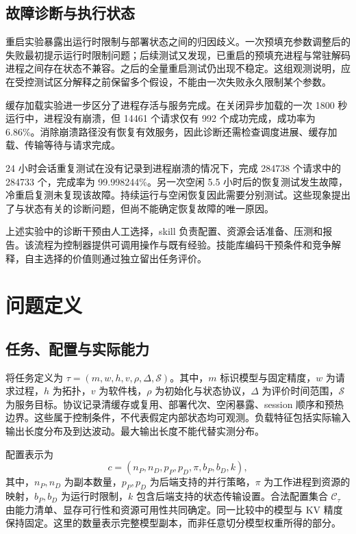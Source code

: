 \documentclass[UTF8,11pt,a4paper,fontset=windows]{ctexart}
\begin{document}
\subsection{故障诊断与执行状态}
重启实验暴露出运行时限制与部署状态之间的归因歧义。一次预填充参数调整后的失败最初提示运行时限制问题；后续测试又发现，已重启的预填充进程与常驻解码进程之间存在状态不兼容。之后的全量重启测试仍出现不稳定。这组观测说明，应在受控测试区分解释之前保留多个假设，不能由一次失败永久限制某个参数。

缓存加载实验进一步区分了进程存活与服务完成。在关闭异步加载的一次 1800 秒运行中，进程没有崩溃，但 14461 个请求仅有 992 个成功完成，成功率为 6.86\%。消除崩溃路径没有恢复有效服务，因此诊断还需检查调度进展、缓存加载、传输等待与请求完成。

24 小时会话重复测试在没有记录到进程崩溃的情况下，完成 284738 个请求中的 284733 个，完成率为 99.998244\%。另一次空闲 5.5 小时后的恢复测试发生故障，冷重启复测未复现该故障。持续运行与空闲恢复因此需要分别测试。这些现象提出了与状态有关的诊断问题，但尚不能确定恢复故障的唯一原因。

上述实验中的诊断干预由人工选择，skill 负责配置、资源会话准备、压测和报告。该流程为控制器提供可调用操作与既有经验。技能库编码干预条件和竞争解释，自主选择的价值则通过独立留出任务评价。

\section{问题定义}
\subsection{任务、配置与实际能力}
将任务定义为 $\tau=(m,w,h,v,\rho,\Delta,\mathcal{S})$。其中，$m$ 标识模型与固定精度，$w$ 为请求过程，$h$ 为拓扑，$v$ 为软件栈，$\rho$ 为初始化与状态协议，$\Delta$ 为评价时间范围，$\mathcal{S}$ 为服务目标。协议记录清缓存或复用、部署代次、空闲暴露、session 顺序和预热边界。这些属于控制条件，不代表假定内部状态均可观测。负载特征包括实际输入输出长度分布及到达波动。最大输出长度不能代替实测分布。

配置表示为
\begin{equation}
 c=(n_P,n_D,p_P,p_D,\pi,b_P,b_D,k),
\end{equation}
其中，$n_P,n_D$ 为副本数量，$p_P,p_D$ 为后端支持的并行策略，$\pi$ 为工作进程到资源的映射，$b_P,b_D$ 为运行时限制，$k$ 包含后端支持的状态传输设置。合法配置集合 $\mathcal{C}_{\tau}$ 由能力清单、显存可行性和资源可用性共同确定。同一比较中的模型与 KV 精度保持固定。这里的数量表示完整模型副本，而非任意切分模型权重所得的部分。
\end{document}
